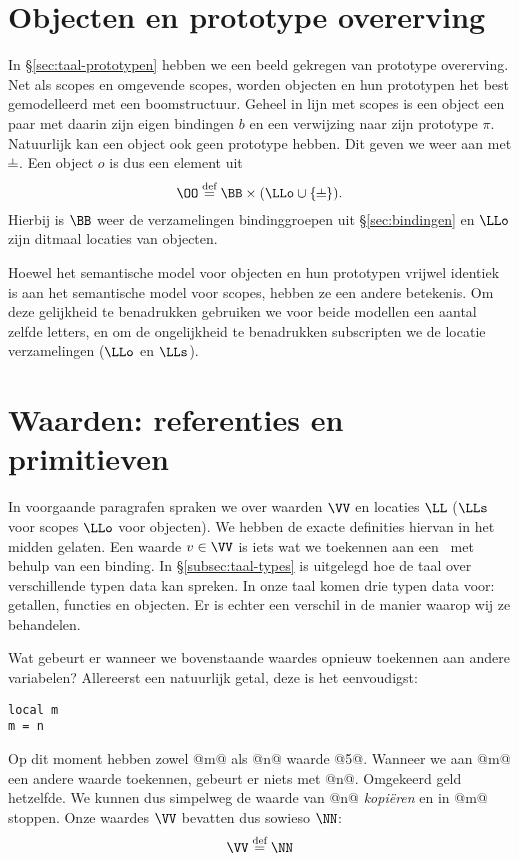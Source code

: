 \section{Objecten en prototype overerving}

In §\ref{sec:taal-prototypen} hebben we een beeld gekregen van prototype overerving. Net als scopes en omgevende scopes, worden objecten en hun prototypen het best gemodelleerd met een boomstructuur. Geheel in lijn met scopes is een object een paar met daarin zijn eigen bindingen $b$ en een verwijzing naar zijn prototype $\pi$. Natuurlijk kan een object ook geen prototype hebben. Dit geven we weer aan met $\nil$. Een object $o$ is dus een element uit
%
\begin{equation*}
  \OO \DEF \BB \times (\LLo \cup \{\nil\}).
\end{equation*}
%
Hierbij is $\BB$ weer de verzamelingen bindinggroepen uit §\ref{sec:bindingen} en $\LLo$ zijn ditmaal locaties van objecten.

Hoewel het semantische model voor objecten en hun prototypen vrijwel identiek is aan het semantische model voor scopes, hebben ze een andere betekenis. Om deze gelijkheid te benadrukken gebruiken we voor beide modellen een aantal zelfde letters, en om de ongelijkheid te benadrukken subscripten we de locatie verzamelingen ($\LLo$ en $\LLs$).

\section{Waarden: referenties en primitieven}
\label{sec:waarden}

In voorgaande paragrafen spraken we over waarden $\VV$ en locaties $\LL$ ($\LLs$ voor scopes $\LLo$ voor objecten). We hebben de exacte definities hiervan in het midden gelaten. Een waarde $v \in \VV$ is iets wat we toekennen aan een \Id\ met behulp van een binding. In §\ref{subsec:taal-types} is uitgelegd hoe de taal over verschillende typen data kan spreken. In onze taal komen drie typen data voor: getallen, functies en objecten. Er is echter een verschil in de manier waarop wij ze behandelen.

Wat gebeurt er wanneer we bovenstaande waardes opnieuw toekennen aan andere variabelen? Allereerst een natuurlijk getal, deze is het eenvoudigst:
\begin{lstlisting}
local m
m = n
\end{lstlisting}
Op dit moment hebben zowel @m@ als @n@ waarde @5@. Wanneer we aan @m@ een andere waarde toekennen, gebeurt er niets met @n@. Omgekeerd geld hetzelfde. We kunnen dus simpelweg de waarde van @n@ \emph{kopiëren} en in @m@ stoppen. Onze waardes $\VV$ bevatten dus sowieso $\NN$:
\begin{equation*}
  \VV \DEF \NN
\end{equation*}

